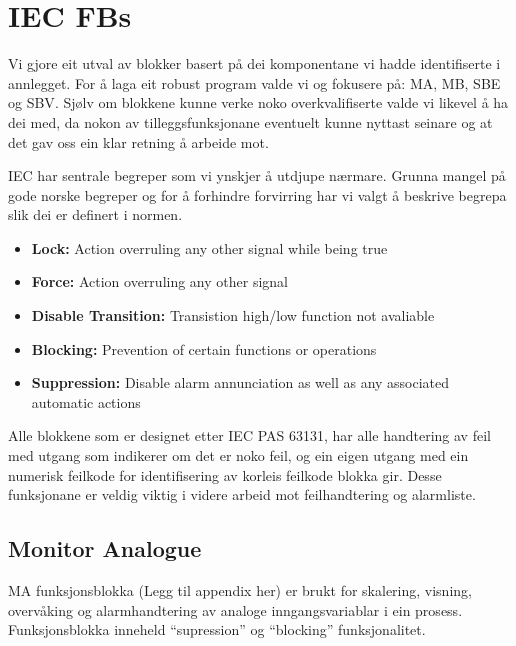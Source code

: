 \section{IEC \glspl{FB}} \label{IEC Seksjon}
\thispagestyle{fancy}





Vi gjore eit utval av blokker basert på dei komponentane vi hadde identifiserte i annlegget.
For å laga eit robust program valde vi og fokusere på: \gls{MA}, \gls{MB}, \gls{SBE} og \gls{SBV}.
Sjølv om blokkene kunne verke noko overkvalifiserte valde vi likevel å ha dei med, da nokon av tilleggsfunksjonane eventuelt kunne nyttast seinare
og at det gav oss ein klar retning å arbeide mot.

\gls{IEC} har sentrale begreper som vi ynskjer å utdjupe nærmare. Grunna mangel på gode norske begreper 
og for å forhindre forvirring har vi valgt å beskrive begrepa slik dei er definert i normen.

\begin{itemize}
    \item \textbf{Lock:} Action overruling any other signal while being true
    \item \textbf{Force:} Action overruling any other signal
    \item \textbf{Disable Transition:} Transistion high/low function not avaliable
    \item \textbf{Blocking:} Prevention of certain functions or operations 
    \item \textbf{Suppression:} Disable alarm annunciation as well as any associated automatic actions
\end{itemize}

Alle blokkene som er designet etter IEC PAS 63131, har alle handtering av feil med utgang som indikerer om det er noko feil, og ein eigen utgang med ein numerisk feilkode for identifisering av korleis feilkode blokka gir. 
Desse funksjonane er veldig viktig i videre arbeid mot feilhandtering og alarmliste. 

\subsection{Monitor Analogue}
\gls{MA} funksjonsblokka (Legg til appendix her) er brukt for skalering, visning, overvåking og alarmhandtering av analoge inngangsvariablar i ein prosess.
Funksjonsblokka inneheld ``supression'' og ``blocking'' funksjonalitet.

